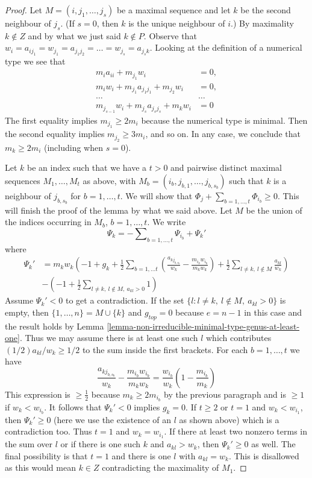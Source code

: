 \documentclass[10pt,a4paper]{amsart}
\theoremstyle{plain}
\theoremstyle{definition}
\theoremstyle{remark}
\numberwithin{equation}{subsection}
\begin{document}
\begin{proof}
\medskip\noindent
Let $M = (i, j_1, \ldots, j_s)$ be a maximal sequence and let
$k$ be the second neighbour of $j_s$. (If $s = 0$, then $k$
is the unique neighbour of $i$.) By maximality $k \not \in Z$
and by what we just said $k \not \in P$. Observe that
$w_i = a_{ij_1} = w_{j_1} = a_{j_1j_2} = \ldots = w_{j_s} =
a_{j_sk}$. Looking at the definition
of a numerical type we see that
\begin{align*}
m_ia_{ii} + m_{j_1}w_i & = 0,\\
m_iw_i + m_{j_1}a_{j_1j_1} + m_{j_2}w_i & = 0,\\
\ldots & \ldots \\
m_{j_{s - 1}}w_i + m_{j_s}a_{j_sj_s} + m_kw_i & = 0
\end{align*}
The first equality implies $m_{j_1} \geq 2m_i$ because the
numerical type is minimal. Then the second equality implies
$m_{j_2} \geq 3m_i$, and so on. In any case, we conclude that
$m_k \geq 2m_i$ (including when $s = 0$).

\medskip\noindent
Let $k$ be an index such that we have a $t > 0$ and pairwise distinct
maximal sequences $M_1, \ldots, M_t$ as above, with
$M_b = (i_b, j_{b, 1}, \ldots, j_{b, s_b})$
such that $k$ is a neighbour of $j_{b, s_b}$ for $b = 1, \ldots, t$.
We will show that $\Phi_j + \sum_{b = 1, \ldots, t} \Phi_{i_b} \geq 0$.
This will finish the proof of the lemma by what we said above.
Let $M$ be the union of the indices occurring in $M_b$, $b = 1, \ldots, t$.
We write
$$
\Psi_k =
-\sum\nolimits_{b = 1, \ldots, t} \Psi_{i_b} + \Psi_k'
$$
where
\begin{align*}
\Psi_k' & =
m_kw_k\left(-1 + g_k +
\frac{1}{2} \sum\nolimits_{b = 1, \ldots t}
(\frac{a_{kj_{b, s_b}}}{w_k} - \frac{m_{i_b}w_{i_b}}{m_kw_k}) +
\frac{1}{2} \sum\nolimits_{l \not = k,\ l \not \in M}
\frac{a_{kl}}{w_k}
\right) \\
&
-\left(
-1 + \frac{1}{2}\sum\nolimits_{l \not = k,\ l \not \in M,\ a_{kl} > 0} 1
\right)
\end{align*}
Assume $\Psi_k' < 0$ to get a contradiction.
If the set $\{l : l \not = k,\ l \not \in M,\ a_{kl} > 0\}$ is empty,
then $\{1, \ldots, n\} = M \cup \{k\}$ and $g_{top} = 0$
because $e = n - 1$ in this case and the result holds by
Lemma \ref{lemma-non-irreducible-minimal-type-genus-at-least-one}.
Thus we may assume there is at least one such $l$ which contributes
$(1/2)a_{kl}/w_k \geq 1/2$ to the sum inside the first brackets.
For each $b = 1, \ldots, t$ we have
$$
\frac{a_{kj_{b, s_b}}}{w_k} - \frac{m_{i_b}w_{i_b}}{m_kw_k} =
\frac{w_{i_b}}{w_k}(1 - \frac{m_{i_b}}{m_k})
$$
This expression is $\geq \frac{1}{2}$ because $m_k \geq 2m_{i_b}$
by the previous paragraph and is $\geq 1$ if $w_k < w_{i_b}$.
It follows that $\Psi_k' < 0$ implies $g_k = 0$.
If $t \geq 2$ or $t = 1$ and $w_k < w_{i_1}$, then $\Psi_k' \geq 0$
(here we use the existence of an $l$ as shown above) which
is a contradiction too.
Thus $t = 1$ and $w_k = w_{i_1}$. If there at least two nonzero terms
in the sum over $l$ or if there is one such $k$ and $a_{kl} > w_k$, then
$\Psi_k' \geq 0$ as well. The final possibility is that $t = 1$ and
there is one $l$ with $a_{kl} = w_k$. This is disallowed as this would
mean $k \in Z$ contradicting the maximality of $M_1$.
\end{proof}



\end{document}
